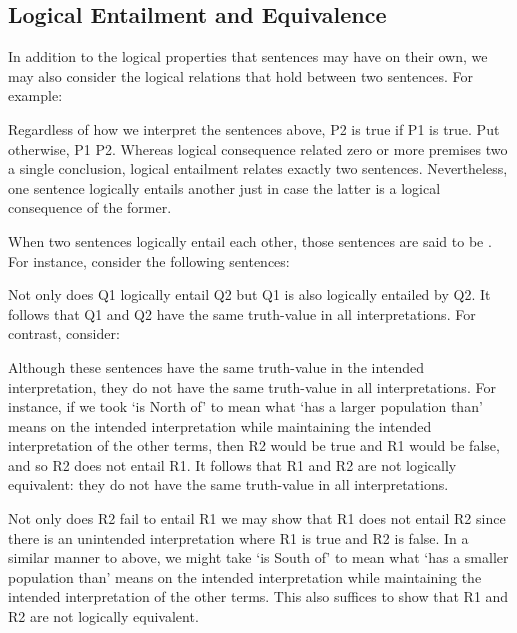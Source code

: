 \subsection{Logical Entailment and Equivalence}

In addition to the logical properties that sentences may have on their own, we may also consider the logical relations that hold between two sentences.
For example:

\begin{earg}
\end{earg}

Regardless of how we interpret the sentences above, P2 is true if P1 is true.
Put otherwise, P1  P2.
Whereas logical consequence related zero or more premises two a single conclusion, logical entailment relates exactly two sentences.
Nevertheless, one sentence logically entails another just in case the latter is a logical consequence of the former.

When two sentences logically entail each other, those sentences are said to be .
For instance, consider the following sentences:

\begin{earg}
\end{earg}

Not only does Q1 logically entail Q2 but Q1 is also logically entailed by Q2.
It follows that Q1 and Q2 have the same truth-value in all interpretations.
For contrast, consider:

\begin{earg}
\end{earg}

Although these sentences have the same truth-value in the intended interpretation, they do not have the same truth-value in all interpretations.
For instance, if we took `is North of' to mean what `has a larger population than' means on the intended interpretation while maintaining the intended interpretation of the other terms, then R2 would be true and R1 would be false, and so R2 does not entail R1.
It follows that R1 and R2 are not logically equivalent: they do not have the same truth-value in all interpretations.

Not only does R2 fail to entail R1 we may show that R1 does not entail R2 since there is an unintended interpretation where R1 is true and R2 is false.
In a similar manner to above, we might take `is South of' to mean what `has a smaller population than' means on the intended interpretation while maintaining the intended interpretation of the other terms.
This also suffices to show that R1 and R2 are not logically equivalent.




